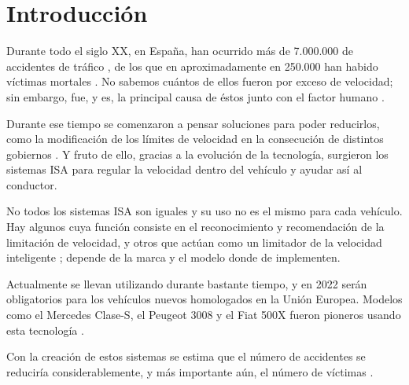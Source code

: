 
\chapter{Introducción} 


Durante todo el siglo XX, en España, han ocurrido más de 7.000.000 de accidentes de tráfico \cite{sigloXX}, de los que en aproximadamente en 250.000 han habido víctimas mortales \cite{vidas}. No sabemos cuántos de ellos fueron por exceso de velocidad; sin embargo, fue, y es, la principal causa de éstos junto con el factor humano \cite{dgt-velocidad}. 

Durante ese tiempo se comenzaron a pensar soluciones para poder reducirlos, como la modificación de los límites de velocidad en la consecución de distintos gobiernos \cite{limites-velocidad}. Y fruto de ello, gracias a la evolución de la tecnología, surgieron los sistemas \ac{ISA} para regular la velocidad dentro del vehículo y ayudar así al conductor.

No todos los sistemas \ac{ISA} son iguales y su uso no es el mismo para cada vehículo. Hay algunos cuya función consiste en el reconocimiento y recomendación de la limitación de velocidad, y otros que actúan como un limitador de la velocidad inteligente \cite{2022}; depende de la marca y el modelo donde de implementen.

Actualmente se llevan utilizando durante bastante tiempo, y en 2022 serán obligatorios para los vehículos nuevos homologados en la Unión Europea. Modelos como el Mercedes Clase-S, el Peugeot 3008 y el Fiat 500X fueron pioneros usando esta tecnología \cite{2022}.




Con la creación de estos sistemas se estima que el número de accidentes se reduciría considerablemente, y más importante aún, el número de víctimas \cite{reduccion}.


